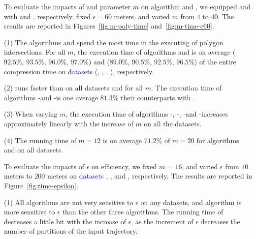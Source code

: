 To evaluate the impacts of \rpia and parameter $m$ on algorithm \cist and \cista, we
equipped \cist and \cista with \rpia and \cpia, respectively, fixed $\epsilon =60$ meters, and varied $m$ from $4$ to $40$.
%
The results are reported in Figures~\ref{fig:m-poly-time} and~\ref{fig:m-time-e60}.

\ni(1) The algorithms \cist and \cista spend the most time in the executing of polygon intersections. For all $m$, the execution time of algorithms \cpia and \rpia is on average ($92.5\%$, $93.5\%$, $96.0\%$, $97.0\%$) and ($89.0\%$, $90.5\%$, $92.5\%$, $96.5\%$) of the entire compression time on \textcolor{blue}{datasets} (\truck, \sercar, \geolife, \pricar), respectively.

\ni(2) \rpia runs faster than \cpia on all datasets and for all $m$. The execution time of algorithms \cist-\rpia and \cista-\rpia is one average $81.3\%$ their counterparts with \cpia.

\ni(3) When varying $m$, the execution time of algorithms \cist-\rpia, \cist-\cpia, \cista-\rpia and \cista-\cpia increases approximately linearly with the increase of $m$ on all the datasets.

\ni(4) The running time of $m=12$ is on average {$71.2\%$} of $m=20$ for algorithms \cist and \cista on all datasets.




To evaluate the impacts of $\epsilon$ on efficiency, we fixed $m$ = $16$, and varied $\epsilon$  from $10$ meters to $200$ meters on \textcolor{blue}{datasets} \truck, \sercar, \geolife and \pricar, respectively.
The results are reported in Figure~\ref{fig:time-epsilon}.

\ni(1) All algorithms are not very sensitive to $\epsilon$ on any datasets, and algorithm \dps is more sensitive to $\epsilon$ than the other three algorithms.
The running time of \dps decreases a little bit with the increase of $\epsilon$, as the increment of $\epsilon$ decreases the number of partitions of the input trajectory.


